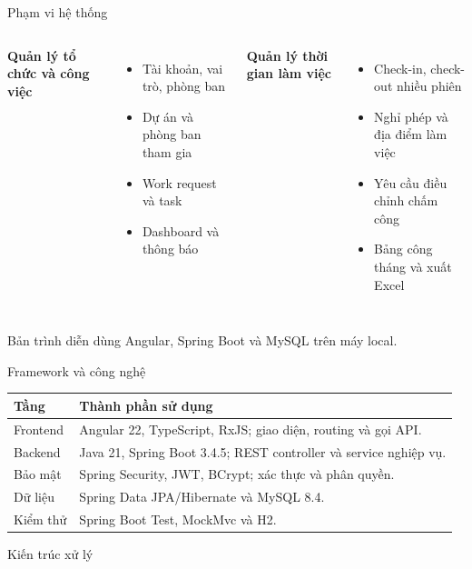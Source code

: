 \documentclass[aspectratio=169,11pt]{beamer}
\begin{document}
\begin{frame}{Phạm vi hệ thống}
\begin{columns}[T,onlytextwidth]
\textbf{Quản lý tổ chức và công việc}
\begin{itemize}
\item Tài khoản, vai trò, phòng ban
\item Dự án và phòng ban tham gia
\item Work request và task
\item Dashboard và thông báo
\end{itemize}
\textbf{Quản lý thời gian làm việc}
\begin{itemize}
\item Check-in, check-out nhiều phiên
\item Nghỉ phép và địa điểm làm việc
\item Yêu cầu điều chỉnh chấm công
\item Bảng công tháng và xuất Excel
\end{itemize}
\end{columns}
\vspace{6mm}
\small Bản trình diễn dùng Angular, Spring Boot và MySQL trên máy local.
\end{frame}

\begin{frame}{Framework và công nghệ}
\begin{tabularx}{\textwidth}{p{2.8cm}X}
\toprule
\textbf{Tầng} & \textbf{Thành phần sử dụng}\\
\midrule
Frontend & Angular 22, TypeScript, RxJS; giao diện, routing và gọi API.\\
Backend & Java 21, Spring Boot 3.4.5; REST controller và service nghiệp vụ.\\
Bảo mật & Spring Security, JWT, BCrypt; xác thực và phân quyền.\\
Dữ liệu & Spring Data JPA/Hibernate và MySQL 8.4.\\
Kiểm thử & Spring Boot Test, MockMvc và H2.\\
\bottomrule
\end{tabularx}
\end{frame}

\begin{frame}{Kiến trúc xử lý}
\centering
{}
\end{frame}
\end{document}
